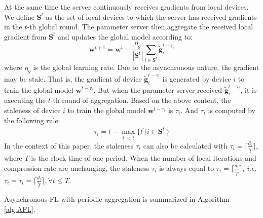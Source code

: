 \documentclass{article}
\begin{document}
At the same time the server continuously receives gradients from local devices. We define $\mathbf{S}^t$ as the set of local devices to which the server has received gradients in the $t$-th global round. The parameter server then aggregate the received local gradient from $\mathbf{S}^t$ and updates the global model according to:
\begin{equation}
    \label{equ:global update}
    \mathbf{w}^{t + 1} = \mathbf{w}^{t} - \frac{\eta_g}{|\mathbf{S}^t|} \sum_{i \in \mathbf{S}^t}  \tilde{\mathbf{g}}_i^{t - \tau_i}
\end{equation}
where $\eta_g$ is the global learning rate. Due to the asynchronous nature, the gradient may be stale. That is, the gradient of device $\tilde{\mathbf{g}}_i^{t - \tau_i}$ is generated by device $i$ to train the global model $\mathbf{w}^{t - \tau_i}$. But when the parameter server received $\tilde{\mathbf{g}}_i^{t - \tau_i}$, it is executing the $t$-th round of aggregation. Based on the above content, the staleness of device $i$ to train the global model $\mathbf{w}^{t - \tau_i}$ is $\tau_i$. And $\tau_i$ is computed by the following rule:
\begin{equation}
\label{equ:staleness}
    \tau_i = t - \mathop{max}_{t^{'} < t} \{t^{'} | i \in \mathbf{S}^{t^{'}} \}
\end{equation}
In the context of this paper, the staleness $\tau_i$ can also be calculated with $\tau_i = \lceil \frac{d_i}{\tilde{T}}\rceil$, where $\tilde{T}$ is the clock time of one period. When the number of local iterations and compression rate are unchanging, the staleness $\tau_i$ is always equal to $\tau_i = \lceil \frac{d_i}{\tilde{T}}\rceil$, \textit{i.e. $\tau_i = \tau_i = \lceil \frac{d_i}{\tilde{T}}\rceil, \forall t \le T$.}

Asynchronous FL with periodic aggregation is summarized in Algorithm \ref{alg:AFL}.
\end{document}
